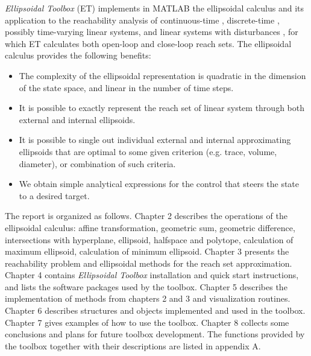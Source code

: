 {\it Ellipsoidal Toolbox} (ET) implements in MATLAB
the ellipsoidal calculus \cite{kurvalyi}
and its application to the reachability analysis of continuous-time
\cite{kurvar}, discrete-time \cite{pvak}, possibly time-varying linear systems,
and linear systems with disturbances \cite{kurvar2},
for which ET calculates both open-loop and close-loop reach sets.
The ellipsoidal calculus provides the following benefits:
\begin{itemize}
\item The complexity of the
ellipsoidal representation is quadratic in the dimension of
the state space, and linear in the number of time steps.
\item It is possible to exactly represent the reach set of
linear system through both external and internal ellipsoids.
\item It is possible to single out individual external and internal
approximating ellipsoids that are optimal to some given criterion
(e.g. trace, volume, diameter), or combination of such criteria.
\item We obtain simple analytical expressions for the control
that steers the state to a desired target.
\end{itemize}
The report is organized as follows.
\newline
Chapter 2 describes the operations of the
ellipsoidal calculus: affine transformation, geometric sum,
geometric difference, intersections with
hyperplane, ellipsoid, halfspace and polytope, calculation of maximum ellipsoid,
calculation of minimum ellipsoid.
\newline
Chapter 3 presents the reachability problem and ellipsoidal methods for
the reach set approximation.
\newline
Chapter 4 contains {\it Ellipsoidal Toolbox} installation and quick start
instructions, and lists the software packages used by the toolbox.
\newline
Chapter 5 describes the implementation of methods from chapters 2 and 3
and visualization routines.
\newline
Chapter 6 describes structures and objects implemented and
used in the toolbox.
\newline
Chapter 7 gives examples of how to use the toolbox.
\newline
Chapter 8 collects some conclusions and plans for future toolbox development.
\newline
The functions provided by the toolbox together with their descriptions
are listed in appendix A.
